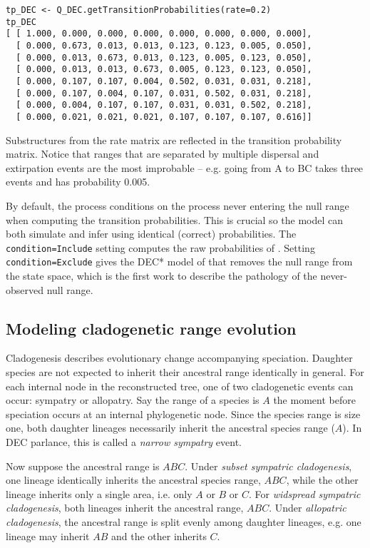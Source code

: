 \begin{snugshade}
\begin{lstlisting}
tp_DEC <- Q_DEC.getTransitionProbabilities(rate=0.2)
tp_DEC
[ [ 1.000, 0.000, 0.000, 0.000, 0.000, 0.000, 0.000, 0.000],
  [ 0.000, 0.673, 0.013, 0.013, 0.123, 0.123, 0.005, 0.050],
  [ 0.000, 0.013, 0.673, 0.013, 0.123, 0.005, 0.123, 0.050],
  [ 0.000, 0.013, 0.013, 0.673, 0.005, 0.123, 0.123, 0.050],
  [ 0.000, 0.107, 0.107, 0.004, 0.502, 0.031, 0.031, 0.218],
  [ 0.000, 0.107, 0.004, 0.107, 0.031, 0.502, 0.031, 0.218],
  [ 0.000, 0.004, 0.107, 0.107, 0.031, 0.031, 0.502, 0.218],
  [ 0.000, 0.021, 0.021, 0.021, 0.107, 0.107, 0.107, 0.616]]
\end{lstlisting}
\end{snugshade}

Substructures from the rate matrix are reflected in the transition probability matrix.
Notice that ranges that are separated by multiple dispersal and extirpation events are the most improbable -- e.g. going from A to BC takes three events and has probability 0.005.

By default, the process conditions on the process never entering the null range when computing the transition probabilities.
This is crucial so the model can both simulate and infer using identical (correct) probabilities.
The  {\tt condition=Include} setting computes the raw probabilities of \citep{ree05}.
Setting {\tt condition=Exclude} gives the DEC* model of \citep{massana15} that removes the null range from the state space, which is the first work to describe the pathology of the never-observed null range.

\subsection{Modeling cladogenetic range evolution}

Cladogenesis describes evolutionary change accompanying speciation.
Daughter species are not expected to inherit their ancestral range identically in general.
For each internal node in the reconstructed tree, one of two cladogenetic events can occur: sympatry or allopatry.
Say the range of a species is $A$ the moment before speciation occurs at an internal phylogenetic node.
Since the species range is size one, both daughter lineages necessarily inherit the ancestral species range ($A$).
In DEC parlance, this is called a {\it narrow sympatry} event.

Now suppose the ancestral range is $ABC$.
Under {\it subset sympatric cladogenesis}, one lineage identically inherits the ancestral species range, $ABC$, while the other lineage inherits only a single area, i.e. only $A$ or $B$ or $C$.
For {\it widspread sympatric cladogenesis}, both lineages inherit the ancestral range, $ABC$.
Under {\it allopatric cladogenesis}, the ancestral range is split evenly among daughter lineages, e.g. one lineage may inherit $AB$ and the other inherits $C$.

